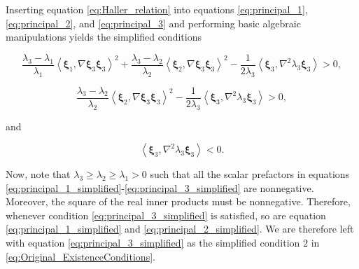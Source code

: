 Inserting equation \eqref{eq:Haller_relation} into equations \eqref{eq:principal_1}, \eqref{eq:principal_2}, and \eqref{eq:principal_3} and performing basic algebraic manipulations yields the simplified conditions

\begin{equation}\label{eq:principal_1_simplified}
\frac{\lambda_3-\lambda_1}{\lambda_1}
\left\langle\bm{\xi}_1,\nabla\bm{\xi}_3\bm{\xi}_3\right\rangle^2 +
\frac{\lambda_3-\lambda_2}{\lambda_2}
\left\langle\bm{\xi}_2,\nabla\bm{\xi}_3\bm{\xi}_3\right\rangle^2
-\frac{1}{2\lambda_3}\left\langle\bm{\xi}_3,\nabla^2\lambda_3\bm{\xi}_3\right\rangle > 0,
\end{equation}

\begin{equation}\label{eq:principal_2_simplified}
\frac{\lambda_3-\lambda_2}{\lambda_2}
\left\langle\bm{\xi}_2,\nabla\bm{\xi}_3\bm{\xi}_3\right\rangle^2 - 
\frac{1}{2\lambda_3}\left\langle\bm{\xi}_3,\nabla^2\lambda_3\bm{\xi}_3\right\rangle > 0,
\end{equation}

\noindent and

\begin{equation}\label{eq:principal_3_simplified}
\left\langle\bm{\xi}_3,\nabla^2\lambda_3\bm{\xi}_3\right\rangle < 0.
\end{equation}

Now, note that $\lambda_3 \geq \lambda_2 \geq \lambda_1 > 0$ such that all the scalar prefactors in equations \eqref{eq:principal_1_simplified}-\eqref{eq:principal_3_simplified} are nonnegative. Moreover, the square of the real inner products must be nonnegative. Therefore, whenever condition \eqref{eq:principal_3_simplified} is satisfied, so are equation \eqref{eq:principal_1_simplified} and \eqref{eq:principal_2_simplified}. We are therefore left with equation \eqref{eq:principal_3_simplified} as the simplified condition $2$ in \eqref{eq:Original_ExistenceConditions}.